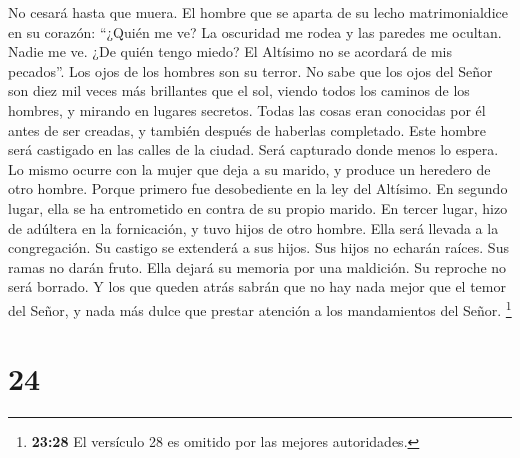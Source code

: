 No cesará hasta que muera.  El hombre que se aparta de su
lecho matrimonialdice en su corazón: ``¿Quién me ve? La oscuridad me
rodea y las paredes me ocultan. Nadie me ve. ¿De quién tengo miedo? El
Altísimo no se acordará de mis pecados''.  Los ojos de
los hombres son su terror. No sabe que los ojos del Señor son diez mil
veces más brillantes que el sol, viendo todos los caminos de los
hombres, y mirando en lugares secretos.  Todas las cosas
eran conocidas por él antes de ser creadas, y también después de
haberlas completado.  Este hombre será castigado en las
calles de la ciudad. Será capturado donde menos lo espera.
 Lo mismo ocurre con la mujer que deja a su marido, y
produce un heredero de otro hombre.  Porque primero fue
desobediente en la ley del Altísimo. En segundo lugar, ella se ha
entrometido en contra de su propio marido. En tercer lugar, hizo de
adúltera en la fornicación, y tuvo hijos de otro hombre. 
Ella será llevada a la congregación. Su castigo se extenderá a sus
hijos.  Sus hijos no echarán raíces. Sus ramas no darán
fruto.  Ella dejará su memoria por una maldición. Su
reproche no será borrado.  Y los que queden atrás sabrán
que no hay nada mejor que el temor del Señor, y nada más dulce que
prestar atención a los mandamientos del Señor. 
\footnote{\textbf{23:28} El versículo 28 es omitido por las mejores
  autoridades.}

\hypertarget{section-23}{%
\section{24}\label{section-23}}

